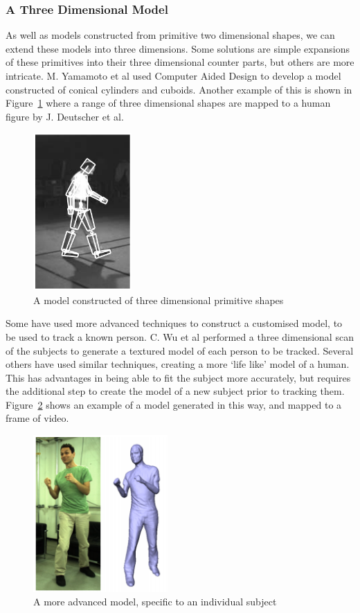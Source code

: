 \subsubsection{A Three Dimensional Model}

As well as models constructed from primitive two dimensional shapes, we can extend these models into three dimensions. Some solutions are simple expansions of these primitives into their three dimensional counter parts, but others are more intricate. M. Yamamoto et al used Computer Aided Design to develop a model constructed of conical cylinders and cuboids\cite{cadmodel}. Another example of this is shown in Figure~\ref{fig:3dmodelajd} where a range of three dimensional shapes are mapped to a human figure by J. Deutscher et al.

\begin{figure}[H]
    \centering
    \includegraphics[height=6cm]{background/images/3dpolygon}

	\caption{A model constructed of three dimensional primitive shapes\cite{stickfigure}}
	\label{fig:3dmodelajd}
\end{figure}

Some have used more advanced techniques to construct a customised model, to be used to track a known person. C. Wu et al performed a three dimensional scan of the subjects to generate a textured model of each person to be tracked\cite{capturystereopaper}. Several others have used similar techniques, creating a more `life like' model of a human. This has advantages in being able to fit the subject more accurately, but requires the additional step to create the model of a new subject prior to tracking them. Figure~\ref{fig:3dtexturedmodel} shows an example of a model generated in this way, and mapped to a frame of video.

\begin{figure}[H]
    \centering
    \includegraphics[height=6cm]{background/images/3dtexture}

	\caption{A more advanced model, specific to an individual subject\cite{capturystereopaper}}
	\label{fig:3dtexturedmodel}
\end{figure}